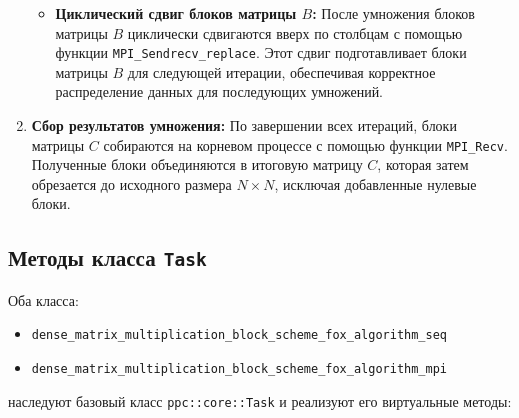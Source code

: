 \documentclass{report}
\begin{document}
\begin{enumerate}
\begin{itemize}
        \item \textbf{Циклический сдвиг блоков матрицы $B$:} После умножения блоков матрицы $B$ циклически сдвигаются вверх по столбцам с помощью функции \texttt{MPI\_Sendrecv\_replace}. Этот сдвиг подготавливает блоки матрицы $B$ для следующей итерации, обеспечивая корректное распределение данных для последующих умножений.
    \end{itemize}
    
    \item \textbf{Сбор результатов умножения:} По завершении всех итераций, блоки матрицы $C$ собираются на корневом процессе с помощью функции \texttt{MPI\_Recv}. Полученные блоки объединяются в итоговую матрицу $C$, которая затем обрезается до исходного размера $N \times N$, исключая добавленные нулевые блоки.
\end{enumerate}

\subsection*{Методы класса \texttt{Task}}

Оба класса:
\begin{itemize}
    \item \texttt{dense\_matrix\_multiplication\_block\_scheme\_fox\_algorithm\_seq}
    \item \texttt{dense\_matrix\_multiplication\_block\_scheme\_fox\_algorithm\_mpi}
\end{itemize}
наследуют базовый класс \texttt{ppc::core::Task} и реализуют его виртуальные методы:
\end{document}
